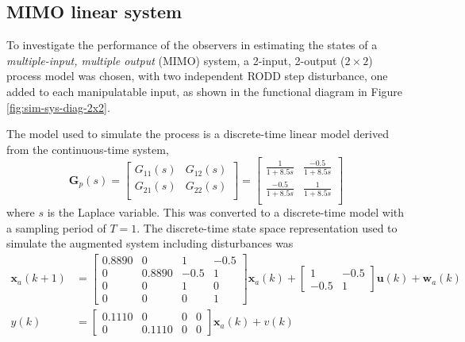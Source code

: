 \subsection{MIMO linear system} \label{sim-obs-lin-2}

To investigate the performance of the observers in estimating the states of a \textit{multiple-input, multiple output} (MIMO) system, a 2-input, 2-output ($2\times2$) process model was chosen, with two independent RODD step disturbance, one added to each manipulatable input, as shown in the functional diagram in Figure \ref{fig:sim-sys-diag-2x2}. 

The model used to simulate the process is a discrete-time linear model derived from the continuous-time system,
\begin{equation} \label{eq:sim-sys-siso--ct}
	\mathbf{G}_p(s) = \left[\begin{array}{cc}
		G_{11}(s) & G_{12}(s)  \\
		G_{21}(s) & G_{22}(s)  \\
	\end{array}\right] = \left[\begin{array}{cc}
		\frac{1}{1+8.5s} & \frac{-0.5}{1+8.5s}  \\
		\frac{-0.5}{1+8.5s} & \frac{1}{1+8.5s}  \\
	\end{array}\right]
\end{equation}
where $s$ is the Laplace variable.  This was converted to a discrete-time model with a sampling period of $T=1$. The discrete-time state space representation used to simulate the augmented system including disturbances was
\begin{equation} \label{eq:sim-sys-2x2-ss-aug}
	\begin{split}
		\mathbf{x}_{a}(k+1) & =\left[\begin{array}{cccc}
			0.8890 & 0 & 1 & -0.5 \\
			0 & 0.8890 & -0.5 & 1 \\
			0 & 0 & 1 & 0 \\
			0 & 0 & 0 & 1
		\end{array}\right] \mathbf{x}_{a}(k) + \left[\begin{array}{cc}
			1 & -0.5 \\
			-0.5 & 1
		\end{array}\right] \mathbf{u}(k) + \mathbf{w}_{a}(k) \\
		y(k) & =\left[\begin{array}{cccc}
			0.1110 & 0 & 0 & 0 \\
			0 & 0.1110 & 0 & 0
		\end{array}\right] \mathbf{x}_{a}(k) + v(k)
	\end{split}
\end{equation}
